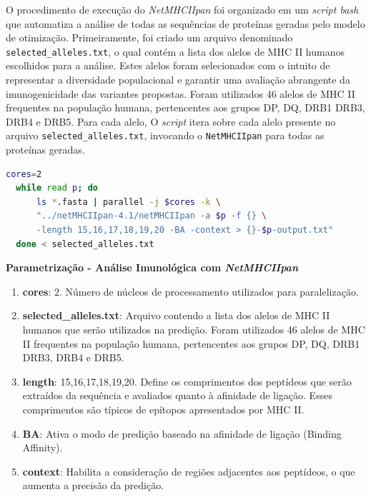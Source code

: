 O procedimento de execução do \textit{NetMHCIIpan} foi organizado em um \textit{script bash} 
que automatiza a análise de todas as sequências de proteínas geradas pelo modelo de otimização. 
Primeiramente, foi criado um arquivo denominado \texttt{selected\_alleles.txt}, 
o qual contém a lista dos alelos de MHC II humanos escolhidos para a análise. 
Estes alelos foram selecionados com o intuito de representar a diversidade populacional e garantir uma avaliação 
abrangente da imunogenicidade das variantes propostas.
Foram utilizados 46 alelos de MHC II frequentes na população humana, 
pertencentes aos grupos DP, DQ, DRB1 DRB3, DRB4 e DRB5.
Para cada alelo,
O \textit{script} itera sobre cada alelo presente no arquivo \texttt{selected\_alleles.txt}, 
invocando o \texttt{NetMHCIIpan} para todas as proteínas geradas.

\begin{lstlisting}[language=bash, breaklines=true, frame=single, backgroundcolor=\color{lightgray}]
  cores=2  
  while read p; do
      ls *.fasta | parallel -j $cores -k \
      "../netMHCIIpan-4.1/netMHCIIpan -a $p -f {} \
      -length 15,16,17,18,19,20 -BA -context > {}-$p-output.txt"
  done < selected_alleles.txt
\end{lstlisting}

\textbf{Parametrização - Análise Imunológica com \textit{NetMHCIIpan}}
\begin{enumerate}
    \item \textbf{cores}: 2. Número de núcleos de processamento utilizados para paralelização.
    \item \textbf{selected\_alleles.txt}: Arquivo contendo a lista dos alelos de MHC II humanos que serão utilizados na predição. Foram utilizados 46 alelos de MHC II frequentes na população humana, pertencentes aos grupos DP, DQ, DRB1 DRB3, DRB4 e DRB5.
    \item \textbf{length}: 15,16,17,18,19,20. Define os comprimentos dos peptídeos que serão extraídos da sequência e avaliados quanto à afinidade de ligação. Esses comprimentos são típicos de epítopos apresentados por MHC II.
    \item \textbf{BA}: Ativa o modo de predição baseado na afinidade de ligação (Binding Affinity).
    \item \textbf{context}: Habilita a consideração de regiões adjacentes aos peptídeos, o que aumenta a precisão da predição.
\end{enumerate}

